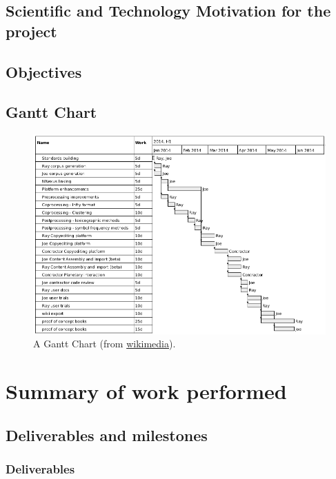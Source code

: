 \documentclass{ani}
\begin{document}
\section{Scientific and Technology Motivation for the project}
\section{Objectives}
\section{Gantt Chart}

\begin{figure}[!htp]
  \includegraphics[width=1\textwidth]{images/gantt.png}
  \caption{A Gantt Chart (from \href{https://commons.wikimedia.org/wiki/File:Planetmathbooks_gantt.png}{wikimedia}).}
\end{figure}

\chapter{Summary of work performed}
\lipsum[5-9]


  \section{Deliverables and milestones}
  \subsection{Deliverables}
  \lipsum[10-12]
\end{document}
